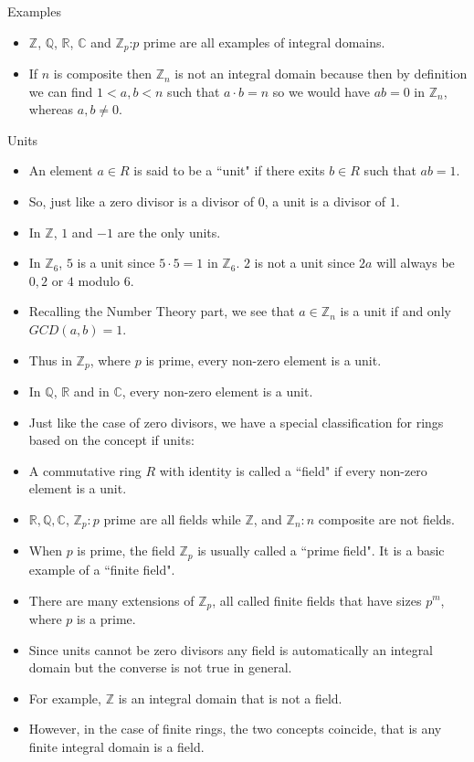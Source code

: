 \documentclass[ %
 10pt, xcolor={dvipsnames,svgnames,x11names,hyperref},
   hyperref={colorlinks=true,citecolor=green,linkcolor=DarkRed,urlcolor=ProcessBlue,anchorcolor=blue}
  ]{beamer}
\newenvironment{stepitemize}{\begin{itemize}[<+->]}{\end{itemize} }
\newcommand{\Z}{\mathbb{Z}}
\newcommand{\Q}{\mathbb{Q}}
\newcommand{\R}{\mathbb{R}}
\newcommand{\C}{\mathbb{C}}
\begin{document}
\begin{frame}{Examples}
\begin{stepitemize}
\item $\Z$, $\Q$, $\R$, $\C$ and $\Z_p$:$p$ prime
 are all examples of integral domains.
 \item If $n$ is composite then $\Z_n$ is not an integral domain because then by definition we can find $1<a,b<n$ such that $a\cdot b=n$ so we would have $ab=0$ in $\Z_n$, whereas $a, b\neq 0$.
\end{stepitemize}

\end{frame}
\begin{frame}{Units}
\begin{stepitemize}
\item An element $a\in R$ is said to be a ``unit" if there exits $b\in R$ such that $ab=1$.
\item So,  just like a zero divisor is a divisor of $0$, a unit is a divisor of $1$.
\item In $\Z$, $1$ and $-1$ are the only units.
    \item In $\Z_6$, $5$ is a unit since $5\cdot 5 =1$ in $\Z_6$. $2$ is not a unit since $2a$ will always be $0,2$ or $4$ modulo $6$.
    \item Recalling the Number Theory part, we see that $a\in \Z_n$ is a unit if and only $GCD(a,b)=1$.
    \item Thus in $\Z_p$, where $p$ is prime, every non-zero element is a unit.
    \item In $\Q$, $\R$ and in $\C$, every non-zero element is a unit.
\end{stepitemize}
    \end{frame}
\begin{frame}{}
    \begin{stepitemize}
    \item Just like the case of zero divisors, we have a special classification for rings based on the concept if units:
\item A commutative ring $R$ with identity is called a ``field" if every non-zero element is a unit.
\item
$\R, \Q, \C$, $\Z_p:p$ prime are all fields while $\Z$, and $\Z_n:n$ composite are not fields.
\item When $p$ is prime, the field $\Z_p$ is usually called a ``prime field". It is a basic example of a ``finite field". \item There are many extensions of $\Z_p$, all called finite fields that have sizes $p^m$, where $p$ is a prime.

\item Since units cannot be zero divisors any field is automatically an integral domain but the converse is not true in general.
\item For example, $\Z$ is an integral domain that is not a field.
\item However, in the case of finite rings, the two concepts coincide, that is any finite integral domain is a field.
    \end{stepitemize}
\end{frame}
\end{document}
